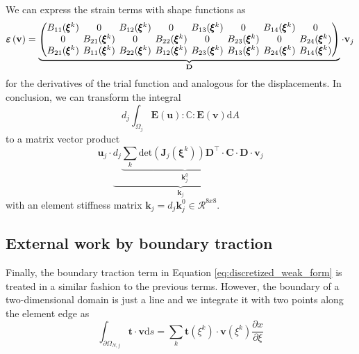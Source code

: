 We can express the strain terms with shape functions as 
\begin{equation}
    \setlength\arraycolsep{2pt}
    \pmb{\varepsilon}\left(\mathbf{v}\right)
    =
    \underbrace{
    \begin{pmatrix}
            B_{11}(\pmb{\xi}^k) & 0 & B_{12}(\pmb{\xi}^k) & 0 & B_{13}(\pmb{\xi}^k) & 0 & B_{14}(\pmb{\xi}^k) & 0\\
            0 & B_{21}(\pmb{\xi}^k) & 0 & B_{22}(\pmb{\xi}^k) & 0 & B_{23}(\pmb{\xi}^k) & 0 & B_{24}(\pmb{\xi}^k)\\
            B_{21}(\pmb{\xi}^k) & B_{11}(\pmb{\xi}^k) & B_{22}(\pmb{\xi}^k) & B_{12}(\pmb{\xi}^k) & B_{23}(\pmb{\xi}^k) & B_{13}(\pmb{\xi}^k) & B_{24}(\pmb{\xi}^k) & B_{14}(\pmb{\xi}^k)\\
    \end{pmatrix} 
    }_{\mathbf{D}}
    \cdot 
    \mathbf{v}_j
\end{equation}
for the derivatives of the trial function and analogous for the displacements. In conclusion, we can transform the integral 
\begin{equation}
    d_j \int_{\Omega_j} \mathbf{E}(\mathbf{u}) : \mathbb{C} :  \mathbf{E}(\mathbf{v}) \text{d}A 
\end{equation}
to a matrix vector product 
\begin{equation}
    \mathbf{u}_j \cdot 
    \underbrace{
    d_j 
    \underbrace{ 
    \sum_k \text{det}\left(\mathbf{J}_j(\pmb{\xi}^k)\right)\mathbf{D}^\top \cdot \mathbf{C} \cdot \mathbf{D}}_{\mathbf{k}^0_j}
    }_{\mathbf{k}_j}
    \cdot \mathbf{v}_j
\end{equation}
with an element stiffness matrix $\mathbf{k}_j = d_j  \mathbf{k}^0_j \in \mathcal{R}^{8x8}$. 

\subsection{External work by boundary traction}
Finally, the boundary traction term in Equation \eqref{eq:discretized_weak_form} is treated in a similar fashion to the previous terms. However, the boundary of a two-dimensional domain is just a line and we integrate it with two points along the element edge as 
\begin{equation}
    \int_{\partial \Omega_{N,j}} \mathbf{t} \cdot \mathbf{v} \text{d}s
    =
    \sum_k \mathbf{t}(\xi^k) \cdot \mathbf{v}(\xi^k) \frac{\partial x}{\partial \xi} 
\end{equation}

